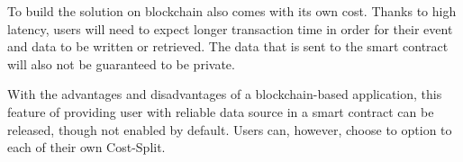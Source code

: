 \documentclass[twoside,draftfooter]{tutthesis} %
\newif\ifnameyear
\begin{document}
To build the solution on blockchain also comes with its own cost. Thanks to high latency, users will need to expect longer transaction time in order for their event and data to be written or retrieved. The data that is sent to the smart contract will also not be guaranteed to be private.

With the advantages and disadvantages of a blockchain-based application, this feature of providing user with reliable data source in a smart contract can be released, though not enabled by default. Users can, however, choose to option to each of their own Cost-Split.



\ifnameyear
  
\else
  
\fi

\end{document}
